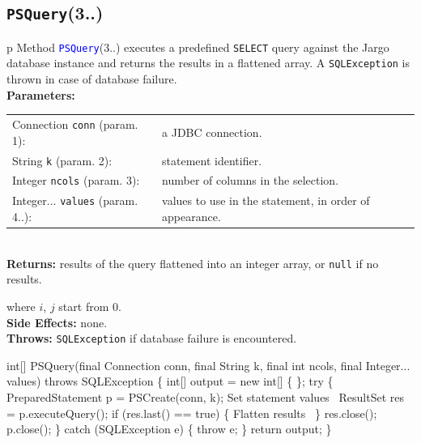 \subsection{\texttt{PSQuery}(3..)}
\begin{tabular}{p{\textwidth}}
\toprule
{}
Method \textcolor{blue}{{\tt{}\protect{}PSQuery}}(3..) executes a predefined {\tt{}SELECT}
query against the Jargo database instance and returns the results in a
flattened array. A {\tt{}SQLException} is thrown in case of database failure.\\
\midrule
\textbf{Parameters:} \\
\begin{tabular}{lp{116mm}}
Connection {\tt{}conn} (param. 1):&a JDBC connection.\\
String {\tt{}k} (param. 2):&statement identifier.\\
Integer {\tt{}ncols} (param. 3):&number of columns in the selection.\\
Integer... {\tt{}values} (param. 4..):&values to use in the statement, in order
of appearance.
\end{tabular}\\
\textbf{Returns:} results of the query flattened into an integer array,
or {\tt{}null} if no results.


where $i$, $j$ start from 0.\\
\textbf{Side Effects:} none.\\
\textbf{Throws:} {\tt{}SQLException} if database failure is encountered.\\
\bottomrule
\end{tabular}
\nwenddocs{}\endmoddef{}
int[] PSQuery(final Connection conn, final String k, final int ncols, final Integer... values)
throws SQLException \{
  int[] output = new int[] \{ \};
  try \{
    PreparedStatement p = PSCreate(conn, k);
    \LA{}Set statement values~{\nwtagstyle{}}\RA{}
    ResultSet res = p.executeQuery();
    if (res.last() == true) \{
      \LA{}Flatten results~{\nwtagstyle{}}\RA{}
    \}
    res.close();
    p.close();
  \} catch (SQLException e) \{
    throw e;
  \}
  return output;
\}
\eatline
{}\nwendcode{}\nwdocspar
